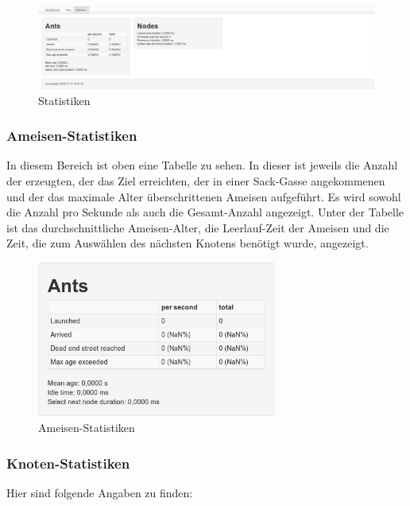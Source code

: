 \begin{figure}[htbp]
  \centering
  \includegraphics[width=\textwidth]{Bilder/Statistiken.png}
  \caption{Statistiken}
  \label{fig:statistiken}
\end{figure}

\subsubsection{Ameisen-Statistiken}
\label{sec:ameisen-statistiken}

In diesem Bereich ist oben eine Tabelle zu sehen.
In dieser ist jeweils die Anzahl der erzeugten, der das Ziel erreichten, der in einer Sack-Gasse angekommenen und der das maximale Alter überschrittenen Ameisen aufgeführt.
Es wird sowohl die Anzahl pro Sekunde als auch die Gesamt-Anzahl angezeigt.
Unter der Tabelle ist das durchschnittliche Ameisen-Alter, die Leerlauf-Zeit der Ameisen und die Zeit, die zum Auswählen des nächsten Knotens benötigt wurde, angezeigt.

\begin{figure}[htbp]
  \centering
  \includegraphics[width=0.7\textwidth]{Bilder/Ameisen-Statistiken.png}
  \caption{Ameisen-Statistiken}
  \label{fig:ameisen-statistiken}
\end{figure}

\subsubsection{Knoten-Statistiken}
\label{sec:Knoten-statistiken}

Hier sind folgende Angaben zu finden:

